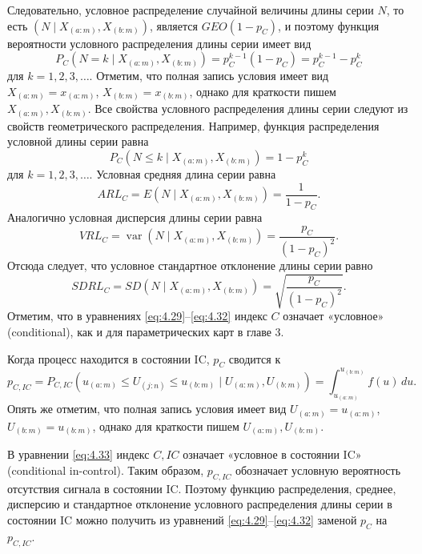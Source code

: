 Следовательно, условное распределение случайной величины длины серии \(N\), то есть \(\left( N \mid X_{(a:m)}, X_{(b:m)} \right)\), является \(GEO(1 - p_C)\), и поэтому функция вероятности условного распределения длины серии имеет вид
\begin{equation}
	P_C\left( N = k \mid X_{(a:m)}, X_{(b:m)} \right) = p_C^{k-1}(1 - p_C) = p_C^{k-1} - p_C^{k}
	\label{eq:4.28}
\end{equation}
для \(k = 1, 2, 3, \ldots\). Отметим, что полная запись условия имеет вид \(X_{(a:m)} = x_{(a:m)}\), \(X_{(b:m)} = x_{(b:m)}\), однако для краткости пишем \(X_{(a:m)}, X_{(b:m)}\). Все свойства условного распределения длины серии следуют из свойств геометрического распределения. Например, функция распределения условной длины серии равна
\begin{equation}
	P_C\left( N \le k \mid X_{(a:m)}, X_{(b:m)} \right) = 1 - p_C^{k}
	\label{eq:4.29}
\end{equation}
для \(k = 1, 2, 3, \ldots\). Условная средняя длина серии равна
\begin{equation}
	ARL_C = E\left( N \mid X_{(a:m)}, X_{(b:m)} \right) = \frac{1}{1 - p_C}.
	\label{eq:4.30}
\end{equation}
Аналогично условная дисперсия длины серии равна
\begin{equation}
	VRL_C = \operatorname{var}\left( N \mid X_{(a:m)}, X_{(b:m)} \right) = \frac{p_C}{(1 - p_C)^2}.
	\label{eq:4.31}
\end{equation}
Отсюда следует, что условное стандартное отклонение длины серии равно
\begin{equation}
	SDRL_C = SD\left( N \mid X_{(a:m)}, X_{(b:m)} \right) = \sqrt{\frac{p_C}{(1 - p_C)^2}}.
	\label{eq:4.32}
\end{equation}
Отметим, что в уравнениях \eqref{eq:4.29}--\eqref{eq:4.32} индекс \(C\) означает «условное» (conditional), как и для параметрических карт в главе 3.

Когда процесс находится в состоянии IC, \(p_C\) сводится к
\begin{equation}
	p_{C, IC} = P_{C, IC}\left( u_{(a:m)} \le U_{(j:n)} \le u_{(b:m)} \mid U_{(a:m)}, U_{(b:m)} \right) = \int_{u_{(a:m)}}^{u_{(b:m)}} f(u)\,du.
	\label{eq:4.33}
\end{equation}
Опять же отметим, что полная запись условия имеет вид \(U_{(a:m)} = u_{(a:m)}\), \(U_{(b:m)} = u_{(b:m)}\), однако для краткости пишем \(U_{(a:m)}, U_{(b:m)}\).

В уравнении \eqref{eq:4.33} индекс \(C, IC\) означает «условное в состоянии IC» (conditional in-control). Таким образом, \(p_{C, IC}\) обозначает условную вероятность отсутствия сигнала в состоянии IC. Поэтому функцию распределения, среднее, дисперсию и стандартное отклонение условного распределения длины серии в состоянии IC можно получить из уравнений \eqref{eq:4.29}--\eqref{eq:4.32} заменой \(p_C\) на \(p_{C, IC}\).

